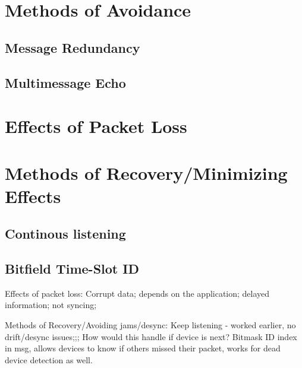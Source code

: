 \section{Methods of Avoidance}
\subsection{Message Redundancy}
\subsection{Multimessage Echo}

\section{Effects of Packet Loss}
\section{Methods of Recovery/Minimizing Effects}
\subsection{Continous listening}
\subsection{Bitfield Time-Slot ID}

Effects of packet loss:
Corrupt data; depends on the application; delayed information; not syncing;

Methods of Recovery/Avoiding jams/desync:
Keep listening - worked earlier, no drift/desync issues;;; How would this handle if device is next?
Bitmask ID index in msg, allows devices to know if others missed their packet, works for dead device detection as well.

